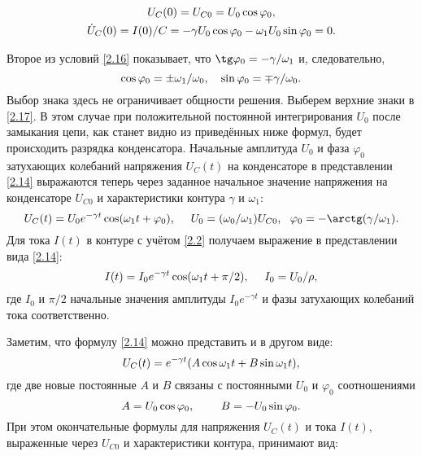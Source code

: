 \begin{equation}
	\eqmark{2.16}
		\begin{gathered}[c]
			U_C(0)=U_{C0}=U_0\cos\varphi_0, \\
			\dot{U}_C(0)=I(0)/C=-\gamma U_0\cos\varphi_0-\omega_1U_0\sin\varphi_0=0.
		\end{gathered}
\end{equation}

Второе из условий \eqref{2.16} показывает, что $\tg\varphi_0=-\gamma/\omega_1$ и, следовательно,
\begin{equation}\eqmark{2.17}
\cos\varphi_0=\pm\omega_1/\omega_0,~~~\sin\varphi_0=\mp\gamma/\omega_0.
\end{equation}
Выбор знака здесь не ограничивает общности решения. Выберем верхние знаки в \eqref{2.17}. В этом случае при положительной постоянной интегрирования $U_0$ после замыкания цепи, как станет видно из приведённых ниже формул, будет происходить разрядка конденсатора. Начальные амплитуда $U_0$ и фаза $\varphi_0$ затухающих колебаний напряжения $U_C(t)$ на конденсаторе в представлении \eqref{2.14} выражаются теперь через заданное начальное значение напряжения на конденсаторе $U_{C0}$ и характеристики контура $\gamma$ и $\omega_1:$
\begin{equation}\eqmark{2.18}
U_C(t)=U_0e^{-\gamma t}\cos(\omega_1t+\varphi_0),~~~~U_0=(\omega_0/\omega_1)U_{C0},~~\varphi_0=-\arctg(\gamma/\omega_1).
\end{equation}
Для тока $I(t)$ в контуре с учётом \eqref{2.2} получаем выражение в представлении вида \eqref{2.14}:
\begin{equation}\eqmark{2.19}
I(t)=I_0e^{-\gamma t}\cos(\omega_1t+\pi/2),~~~~I_0=U_0/\rho,
\end{equation}
где $I_0$ и $\pi/2$ \important{--} начальные значения амплитуды $I_0e^{-\gamma t}$ и фазы затухающих колебаний тока соответственно.

Заметим, что формулу \eqref{2.14} можно представить и в другом виде:			
\begin{equation}\eqmark{2.20}
U_C(t)=e^{-\gamma t}(A\cos\omega_1 t+B\sin\omega_1 t),
\end{equation}
где две новые постоянные $A$ и $B$ связаны с постоянными $U_0$ и $\varphi_0$ соотношениями
\begin{equation}\eqmark{2.21}
A=U_0\cos\varphi_0,~~~~~~~B=-U_0\sin\varphi_0.
\end{equation}
При этом окончательные формулы для напряжения $U_C(t)$ и тока $I(t),$ выраженные через $U_{C0}$ и характеристики контура, принимают вид:

